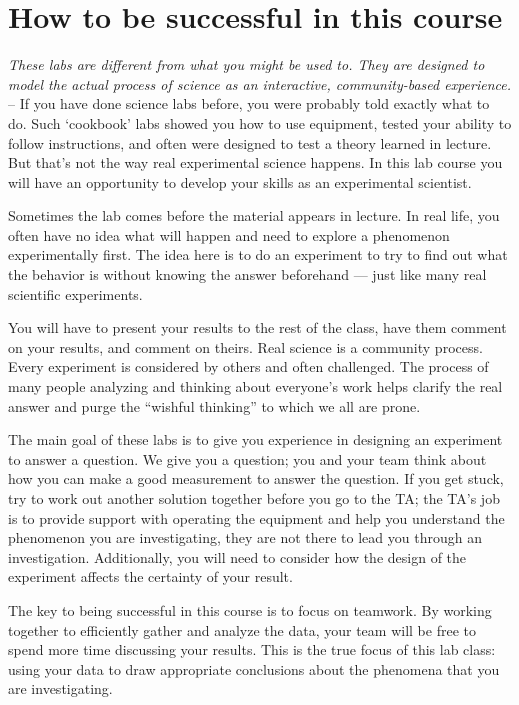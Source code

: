 \section*{How to be successful in this course}
\emph{These labs are different from what you might be used to.
They are designed to model the actual process of science as an interactive, community-based experience.} --
If you have done science labs before, you were probably told exactly what to do.
Such `cookbook' labs showed you how to use equipment, tested your ability to follow instructions, and often were designed to test a theory learned in lecture.
But that's not the way real experimental science happens.
In this lab course you will have an opportunity to develop your skills as an experimental scientist. 
\par
Sometimes the lab comes before the material appears in lecture.
In real life, you often have no idea what will happen and need to explore a phenomenon experimentally first.
The idea here is to do an experiment to try to find out what the behavior is without knowing the answer beforehand — just like many real scientific experiments.
\par
You will have to present your results to the rest of the class, have them comment on your results, and comment on theirs.
Real science is a community process.
Every experiment is considered by others and often challenged.
The process of many people analyzing and thinking about everyone's work helps clarify the real answer and purge the ``wishful thinking'' to which we all are prone.
\par 
The main goal of these labs is to give you experience in designing an experiment to answer a question.
We give you a question; you and your team think about how you can make a good measurement to answer the question.
If you get stuck, try to work out another solution together before you go to the TA; the TA's job is to provide support with operating the equipment and help you understand the phenomenon you are investigating, they are not there to lead you through an investigation.
Additionally, you will need to consider how the design of the experiment affects the certainty of your result.
\par
The key to being successful in this course is to focus on teamwork.
By working together to efficiently gather and analyze the data, your team will be free to spend more time discussing your results.
This is the true focus of this lab class: using your data to draw appropriate conclusions about the phenomena that you are investigating.
